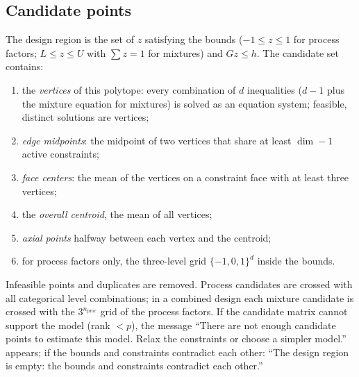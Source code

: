 \subsection{Candidate points}
The design region is the set of $z$ satisfying the bounds ($-1 \le z \le 1$ for process factors; $L \le z \le U$
with $\sum z = 1$ for mixtures) and $Gz \le h$. The candidate set contains:
\begin{enumerate}
\item the \emph{vertices} of this polytope: every combination of $d$ inequalities ($d-1$ plus the mixture equation
for mixtures) is solved as an equation system; feasible, distinct solutions are vertices;
\item \emph{edge midpoints}: the midpoint of two vertices that share at least $\dim - 1$ active constraints;
\item \emph{face centers}: the mean of the vertices on a constraint face with at least three vertices;
\item the \emph{overall centroid}, the mean of all vertices;
\item \emph{axial points} halfway between each vertex and the centroid;
\item for process factors only, the three-level grid $\{-1, 0, 1\}^d$ inside the bounds.
\end{enumerate}
Infeasible points and duplicates are removed. Process candidates are crossed with all categorical level
combinations; in a combined design each mixture candidate is crossed with the $3^{n_{\text{proc}}}$ grid of the
process factors. If the candidate matrix cannot support the model (rank $< p$), the message ``There are not enough
candidate points to estimate this model. Relax the constraints or choose a simpler model.'' appears; if the bounds
and constraints contradict each other: ``The design region is empty: the bounds and constraints contradict each
other.''

